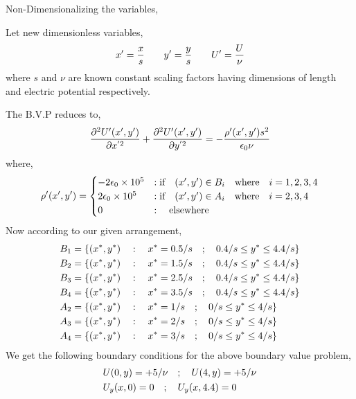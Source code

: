 Non-Dimensionalizing the variables,

Let new dimensionless variables,
\begin{align}
    x' = \frac{x}{s} \gs \gs y' = \frac{y}{s} \gs \gs U' = \frac{U}{\nu}
\end{align}
where $s$ and $\nu$ are known constant scaling factors having dimensions of length and electric potential respectively.

The B.V.P reduces to,
\begin{equation}
    \frac{\partial^2U'(x',y') }{\partial x^{'2}} + \frac{\partial^2U'(x',y') }{\partial y^{'2}}= -\frac{\rho'(x',y') s^2}{\epsilon_0 \nu} \\
\end{equation}
where,
\begin{equation}
\rho'(x',y') =  \begin{cases}
    -2\epsilon_0 \times 10^5  & :\text{if} \hspace{0.35cm} (x',y') \in B_i \hspace{0.35cm} \text{where} \hspace{0.35cm} i = 1,2,3,4 \\
    2\epsilon_0 \times 10^5 & :\text{if} \hspace{0.35cm} (x',y') \in A_i \hspace{0.35cm} \text{where} \hspace{0.35cm} i = 2,3,4 \\
    0  & : \hspace{0.35cm} \text{elsewhere}
\end{cases}
\end{equation}
Now according to our given arrangement,
\begin{align}
    B_1 &= \{ (x^*,y^*) \hspace{0.35cm} : \hspace{0.35cm} x^*= 0.5/s \hspace{0.35cm};\hspace{0.35cm} 0.4/s \leq y^* \leq 4.4/s \} \\
    B_2 &= \{ (x^*,y^*) \hspace{0.35cm} : \hspace{0.35cm} x^*= 1.5/s \hspace{0.35cm};\hspace{0.35cm} 0.4/s \leq y^* \leq 4.4/s \} \\
    B_3 &= \{ (x^*,y^*) \hspace{0.35cm} : \hspace{0.35cm} x^*= 2.5/s \hspace{0.35cm};\hspace{0.35cm} 0.4/s \leq y^* \leq 4.4/s \} \\
    B_4 &= \{ (x^*,y^*) \hspace{0.35cm} : \hspace{0.35cm} x^*= 3.5/s \hspace{0.35cm};\hspace{0.35cm} 0.4/s \leq y^* \leq 4.4/s \} \\
    A_2 &= \{ (x^*,y^*) \hspace{0.35cm} : \hspace{0.35cm} x^*= 1/s \hspace{0.35cm};\hspace{0.35cm} 0/s \leq y^* \leq 4/s \} \\
    A_3 &= \{ (x^*,y^*) \hspace{0.35cm} : \hspace{0.35cm} x^*= 2/s \hspace{0.35cm};\hspace{0.35cm} 0/s \leq y^* \leq 4/s \} \\
    A_4 &= \{ (x^*,y^*) \hspace{0.35cm} : \hspace{0.35cm} x^*= 3/s \hspace{0.35cm};\hspace{0.35cm} 0/s \leq y^* \leq 4/s \} 
\end{align}
We get the following boundary conditions for the above boundary value problem,
\begin{align}
    & U(0,y) = +5/\nu \hspace{0.35cm}; \hspace{0.35cm} U(4,y) = +5/\nu \\ 
    & U_y(x,0) = 0 \hspace{0.35cm}; \hspace{0.35cm} U_y(x,4.4) = 0 
\end{align}

